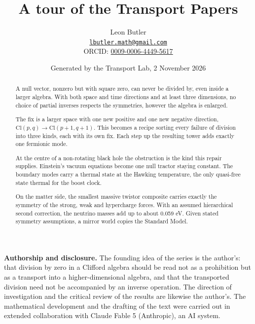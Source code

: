 \documentclass[11pt]{article}
\title{\bfseries A tour of the Transport Papers}
\author{Leon Butler\\ \normalsize\href{mailto:lbutler.math@gmail.com}{\texttt{lbutler.math@gmail.com}}\\ \normalsize ORCID: \href{https://orcid.org/0009-0006-4449-5617}{0009-0006-4449-5617}}
\date{Generated by the Transport Lab, 2 November 2026}
\theoremstyle{definition}
\theoremstyle{plain}
\providecommand{\Cl}{}\renewcommand{\Cl}{\mathrm{Cl}}
\begin{document}
\maketitle
\begin{abstract}
\normalsize
A null vector, nonzero but with square zero, can never be divided by, even inside a larger algebra. With both space and time directions and at least three dimensions, no choice of partial inverses respects the symmetries, however the algebra is enlarged.

The fix is a larger space with one new positive and one new negative direction, $\Cl(p,q) \to \Cl(p{+}1, q{+}1)$. This becomes a recipe sorting every failure of division into three kinds, each with its own fix. Each step up the resulting tower adds exactly one fermionic mode.

At the centre of a non-rotating black hole the obstruction is the kind this repair supplies. Einstein's vacuum equations become one null tractor staying constant. The boundary modes carry a thermal state at the Hawking temperature, the only quasi-free state thermal for the boost clock.

On the matter side, the smallest massive twistor composite carries exactly the symmetry of the strong, weak and hypercharge forces. With an assumed hierarchical second correction, the neutrino masses add up to about 0.059 eV. Given stated symmetry assumptions, a mirror world copies the Standard Model.
\end{abstract}
\newpage
\noindent \textbf{Authorship and disclosure. }The founding idea of the series is the author's: that division by zero in a Clifford algebra should be read not as a prohibition but as a transport into a higher-dimensional algebra, and that the transported division need not be accompanied by an inverse operation. The direction of investigation and the critical review of the results are likewise the author's. The mathematical development and the drafting of the text were carried out in extended collaboration with Claude Fable 5 (Anthropic), an AI system.

\noindent{}
\newpage
\end{document}
